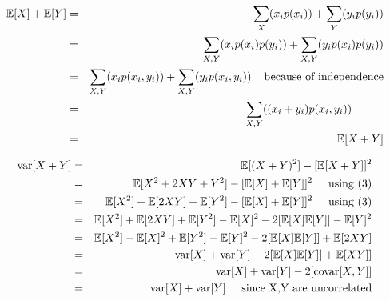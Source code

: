 \begin{eqnarray}
    \mathbb{E}[X]+\mathbb{E}[Y]&=& \sum_{X}(x_i p(x_i)) + \sum_{Y}(y_i p(y_i))\\
    &=& \sum_{X, Y}(x_i p(x_i)p(y_i)) + \sum_{X,Y}(y_i p(x_i)p(y_i))\\
    &=& \sum_{X, Y}(x_i p(x_i,y_i)) + \sum_{X,Y}(y_i p(x_i,y_i)) \hspace{4mm}\mbox{because of independence}\\
    &=& \sum_{X, Y}((x_i+y_i) p(x_i,y_i))\hspace{1cm}\\
    &=& \mathbb{E}[X+Y]
\end{eqnarray}

\begin{eqnarray}
    \text{var}[X+Y]&=& \mathbb{E}[(X+Y)^2] - [\mathbb{E}[X+Y]]^2\\
    &=& \mathbb{E}[X^2+2XY+Y^2] - [\mathbb{E}[X]+\mathbb{E}[Y]]^2 \hspace{5mm}\mbox{using (3)}\\
    &=& \mathbb{E}[X^2]+\mathbb{E}[2XY]+\mathbb{E}[Y^2] - [\mathbb{E}[X]+\mathbb{E}[Y]]^2 \hspace{5mm}\mbox{using (3)}\\
    &=& \mathbb{E}[X^2]+\mathbb{E}[2XY]+\mathbb{E}[Y^2] - \mathbb{E}[X]^2-2[\mathbb{E}[X]\mathbb{E}[Y]] -\mathbb{E}[Y]^2 \\
    &=& \mathbb{E}[X^2]- \mathbb{E}[X]^2 +\mathbb{E}[Y^2]-\mathbb{E}[Y]^2 -2[\mathbb{E}[X]\mathbb{E}[Y]] +\mathbb{E}[2XY]  \\
    &=& \text{var}[X] +\text{var}[Y] -2[\mathbb{E}[X]\mathbb{E}[Y]] +\mathbb{E}[XY]]  \\
    &=& \text{var}[X] +\text{var}[Y] -2[\text{covar}[X,Y]]  \\
    &=& \text{var}[X] +\text{var}[Y]\hspace{5mm}\mbox{since X,Y are uncorrelated} 
\end{eqnarray}
